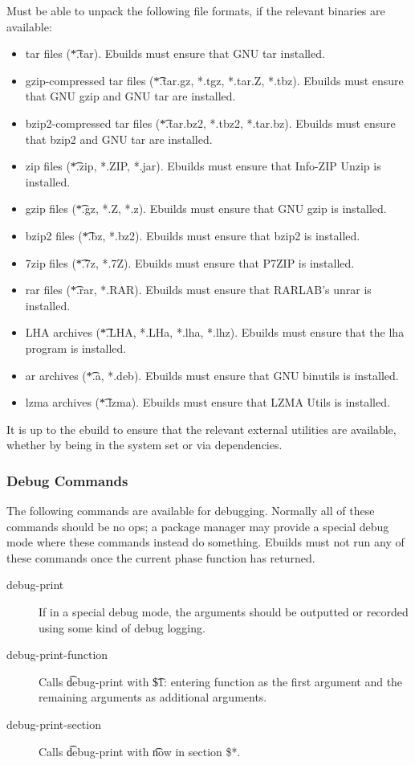 \begin{description}
    Must be able to unpack the following file formats, if the relevant binaries are available:
    \begin{itemize}
    \item tar files (\t{*.tar}). Ebuilds must ensure that GNU tar installed.
    \item gzip-compressed tar files (\t{*.tar.gz, *.tgz, *.tar.Z, *.tbz}). Ebuilds must ensure that
    GNU gzip and GNU tar are installed.
    \item bzip2-compressed tar files (\t{*.tar.bz2, *.tbz2, *.tar.bz}). Ebuilds must ensure that
    bzip2 and GNU tar are installed.
    \item zip files (\t{*.zip, *.ZIP, *.jar}). Ebuilds must ensure that Info-ZIP Unzip is installed.
    \item gzip files (\t{*.gz, *.Z, *.z}). Ebuilds must ensure that GNU gzip is installed.
    \item bzip2 files (\t{*.bz, *.bz2}). Ebuilds must ensure that bzip2 is installed.
    \item 7zip files (\t{*.7z, *.7Z}). Ebuilds must ensure that P7ZIP is installed.
    \item rar files (\t{*.rar, *.RAR}). Ebuilds must ensure that RARLAB's unrar is installed.
    \item LHA archives (\t{*.LHA, *.LHa, *.lha, *.lhz}). Ebuilds must ensure that the lha program is
    installed.
    \item ar archives (\t{*.a, *.deb}). Ebuilds must ensure that GNU binutils is installed.
    \item lzma archives (\t{*.lzma}). Ebuilds must ensure that LZMA Utils is installed.
    \end{itemize}
    It is up to the ebuild to ensure that the relevant external utilities are available, whether by
    being in the system set or via dependencies.
\end{description}

\subsubsection{Debug Commands}
The following commands are available for debugging. Normally all of these commands should be no ops;
a package manager may provide a special debug mode where these commands instead do something.
Ebuilds must not run any of these commands once the current phase function has returned.

\begin{description}
\item[debug-print] If in a special debug mode, the arguments should be outputted or recorded using
    some kind of debug logging.
\item[debug-print-function] Calls \t{debug-print} with \t{\$1: entering function} as the first
    argument and the remaining arguments as additional arguments.
\item[debug-print-section] Calls \t{debug-print} with \t{now in section \$*}.
\end{description}

